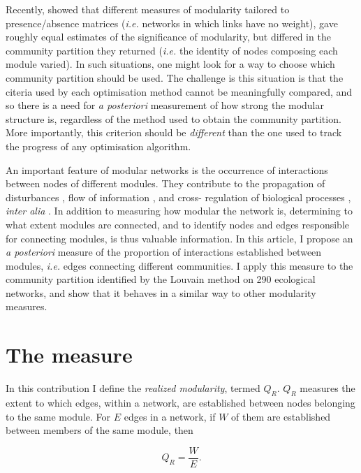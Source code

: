 \documentclass[12pt,oneside]{article}
\begin{document}
Recently, \textcite{thebault_identifying_2012} showed that different
measures of modularity tailored to presence/absence matrices (\emph{i.e.}
networks in which links have no weight), gave roughly equal estimates of
the significance of modularity, but differed in the community partition they
returned (\emph{i.e.} the identity of nodes composing each module varied). In
such situations, one might look for a way to choose which community partition
should be used. The challenge is this situation is that the citeria used by
each optimisation method cannot be meaningfully compared, and so there is a
need for \emph{a posteriori} measurement of how strong the modular structure
is, regardless of the method used to obtain the community partition. More
importantly, this criterion should be \emph{different} than the one used to
track the progress of any optimisation algorithm.

An important feature of modular networks is the occurrence of interactions
between nodes of different modules. They contribute to the propagation of
disturbances \parencite{olesen_modularity_2007}, flow of information
\cite{wiederhold_mediators_1992,leskovec_statistical_2008}, and cross-
regulation of biological processes \cite{hartwell_molecular_1999}, \emph{inter
alia} \cite{rosvall_maps_2008}. In addition to measuring how modular the
network is, determining to what extent modules are connected, and to
identify nodes and edges responsible for connecting modules, is thus 
valuable information. In this article, I propose an \emph{a posteriori}
measure of the proportion of interactions established between modules,
\emph{i.e.} edges connecting different communities. I apply this measure to
the community partition identified by the Louvain method on 290 ecological
networks, and show that it behaves in a similar way to other modularity
measures.

\section{The measure}

In this contribution I define the \emph{realized modularity}, termed $Q_R$.
$Q_R$ measures the extent to which edges, within a network, are established
between nodes belonging to the same module. For $E$ edges in a network, if $W$
of them are established between members of the same module, then

\begin{equation}
Q_R = \frac{W}{E} .
\label{e:qr}
\end{equation} 
\end{document}
